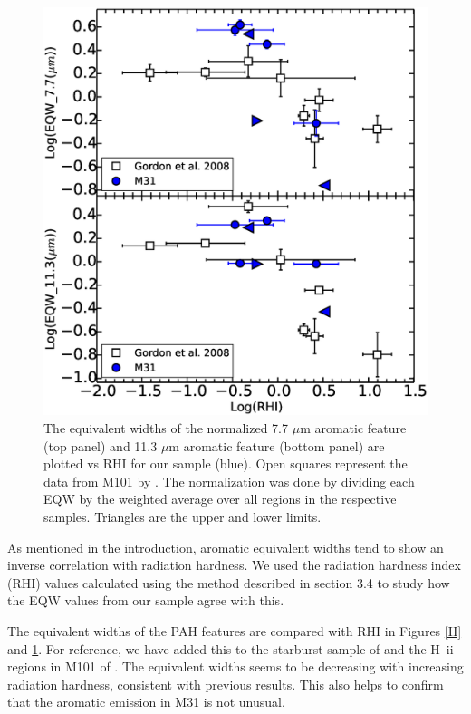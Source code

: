 \documentclass[useAMS,usenatbib,a4paper]{mn2e}
\begin{document}
\begin{figure}
\includegraphics[scale=0.30]{./Gordvsmy.eps}
\caption{ The equivalent widths of the normalized 7.7 $\mu$m aromatic feature (top panel) and 11.3 $\mu$m aromatic feature (bottom panel) are plotted vs RHI for our sample (blue). Open squares represent the data from M101 by \citet{Gordon:2008lr}. The normalization was done by dividing each EQW by the weighted average over all regions in the respective samples. Triangles are the upper and lower limits.}
\label{gordII}

\end{figure}

As mentioned in the introduction, aromatic equivalent widths tend to show an inverse correlation with radiation hardness. We used the radiation hardness index (RHI) values calculated using the method described in section 3.4 to study how the EQW values from our sample agree with this.

The equivalent widths of the PAH features are compared with RHI in Figures \ref{II} and \ref{gordII}.
For reference, we have added this to the starburst sample of \citet{Engelbracht_2008} and the H~{\sc ii} regions in M101 of \citet{Gordon:2008lr}. The equivalent widths seems to be decreasing with increasing radiation hardness, consistent with previous results. This also helps to confirm that the aromatic emission in M31 is not unusual. 
\end{document}
